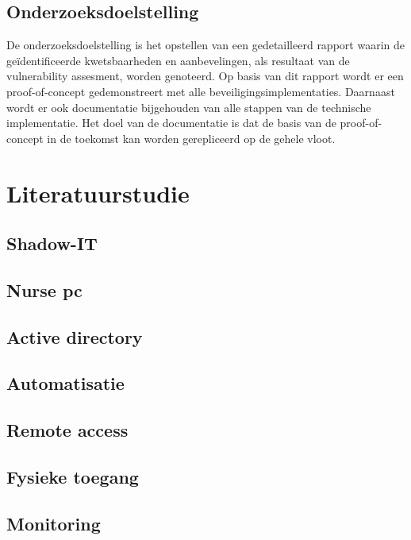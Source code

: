 \subsection{Onderzoeksdoelstelling}
De onderzoeksdoelstelling is het opstellen van een gedetailleerd rapport waarin de geïdentificeerde kwetsbaarheden en aanbevelingen, als resultaat van de vulnerability assesment, worden genoteerd.
Op basis van dit rapport wordt er een proof-of-concept gedemonstreert met alle beveiligingsimplementaties.
Daarnaast wordt er ook documentatie bijgehouden van alle stappen van de technische implementatie.
Het doel van de documentatie is dat de basis van de proof-of-concept in de toekomst kan worden gerepliceerd op de gehele vloot.


\section{Literatuurstudie}%
\label{sec:literatuurstudie}
\subsection{Shadow-IT}
\subsection{Nurse pc}
\subsection{Active directory}
\subsection{Automatisatie}
\subsection{Remote access}
\subsection{Fysieke toegang}
\subsection{Monitoring}




